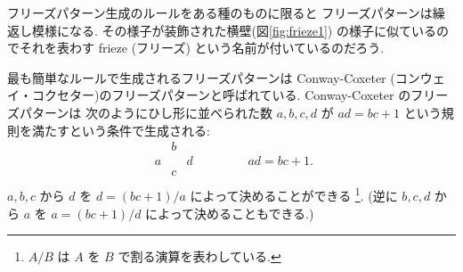 \documentclass[12pt,twoside,dvipdfm]{jarticle}
\theoremstyle{definition} %
\theoremstyle{definition} %
\theoremstyle{definition} %
\numberwithin{theorem}{section}
\numberwithin{equation}{section}
\numberwithin{figure}{section}
\numberwithin{table}{section}
\newcommand\figureref[1]{図\ref{#1}}
\begin{document}
フリーズパターン生成のルールをある種のものに限ると
フリーズパターンは繰返し模様になる.
その様子が装飾された横壁(\figureref{fig:frieze1})
の様子に似ているのでそれを表わす frieze (フリーズ)
という名前が付いているのだろう.

最も簡単なルールで生成されるフリーズパターンは 
Conway-Coxeter (コンウェイ・コクセター)のフリーズパターンと呼ばれている.
Conway-Coxeter のフリーズパターンは
次のようにひし形に並べられた数 $a,b,c,d$ が $ad=bc+1$
という規則を満たすという条件で生成される:
\begin{equation*}
\begin{array}{ccc}
   & b &   \\
 a &   & d \\
   & c &   \\
\end{array}
\qquad\qquad
ad = bc+1.
\end{equation*} 
$a,b,c$ から $d$ を $d = (bc+1)/a$ によって決めることができる%
\footnote{$A/B$ は $A$ を $B$ で割る演算を表わしている.}.
(逆に $b,c,d$ から $a$ を $a=(bc+1)/d$ によって決めることもできる.)
\end{document}

